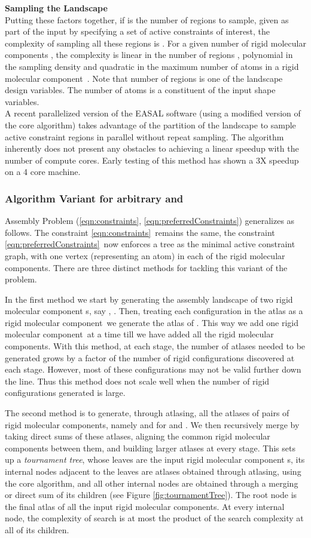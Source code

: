 \documentclass[]{article}
\newcommand{\rmc}{rigid molecular component}
\newcommand{\ctwo}{\ref{eqn:preferredConstraints}}
\newcommand{\cone}{\ref{eqn:constraints}}
\begin{document}
\noindent \textbf{Sampling the Landscape\\}
Putting these factors together, if  is the number of regions to sample,
given as part of the input by specifying a set of active constraints of
interest, the complexity of sampling all these regions is . For a given number of \rmc s , the
complexity is linear in the number of regions , polynomial in the sampling
density  and quadratic in the maximum number of atoms in a \rmc\
.  Note that number of regions  is one of the landscape design variables.
The number of atoms  is a constituent of the input shape variables.\\

A recent parallelized version of the EASAL software (using a modified version
of the core algorithm) takes advantage of the partition of the landscape to
sample active constraint regions in parallel without repeat sampling. The
algorithm inherently does not present any obstacles to achieving a linear
speedup with the number of compute cores. Early testing of this method has
shown a 3X speedup on a 4 core machine.

\subsubsection{Algorithm Variant for arbitrary  and }
\label{sec:AlgorithmVariantkg2}
Assembly Problem (\cone, \ctwo) generalizes as follows. The constraint \cone\
remains the same, the constraint \ctwo\ now enforces a tree as the minimal
active constraint graph, with one vertex (representing an atom) in each of the
 \rmc s. There are three distinct methods for tackling this variant of the
problem. 

In the first method we start by generating the assembly landscape of two \rmc
s, say , . Then, treating each configuration  in the
atlas  as a \rmc\ we generate the atlas of . This way
we add one \rmc\ at a time till we have added all the \rmc s. With this method,
at each stage, the number of atlases needed to be generated grows by a factor
of the number of rigid configurations discovered at each stage. However,
most of these configurations may not be valid further down the line.
Thus this method does not scale well when the number of rigid configurations
generated is large.

The second method is to generate, through atlasing, all the 
atlases of pairs of \rmc s, namely  and  for  and
. We then recursively merge by taking direct sums of these atlases,
aligning the common \rmc s between them, and building larger atlases at every
stage. This sets up a \emph{tournament tree}, whose leaves are the input \rmc
s, its internal nodes adjacent to the leaves are atlases obtained through
atlasing, using the core algorithm, and all other internal nodes are obtained
through a merging or direct sum of its children (see Figure
\ref{fig:tournamentTree}).  The root node is the final atlas of all the input
\rmc s. At every internal node, the complexity of search is at most the product
of the search complexity at all of its children.
\end{document}
